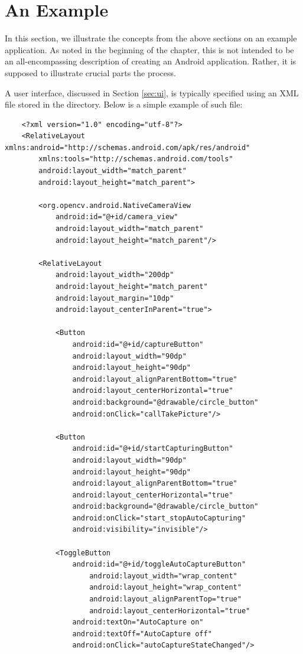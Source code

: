 \section{An Example} 

In this section, we illustrate the concepts from the above sections on an example application. 
As noted in the beginning of the chapter, this is not intended to be an all-encompassing description of creating an Android application. 
Rather, it is supposed to illustrate crucial parts the process. 

A user interface, discussed in Section \ref{sec:ui}, is typically specified using an XML file stored in the  directory.
Below is a simple example of such file: 

\begin{lstlisting}
    <?xml version="1.0" encoding="utf-8"?>
    <RelativeLayout xmlns:android="http://schemas.android.com/apk/res/android"
        xmlns:tools="http://schemas.android.com/tools"
        android:layout_width="match_parent"
        android:layout_height="match_parent">
    
        <org.opencv.android.NativeCameraView
            android:id="@+id/camera_view"
            android:layout_width="match_parent"
            android:layout_height="match_parent"/>
        
        <RelativeLayout
    	    android:layout_width="200dp"
    	    android:layout_height="match_parent"
    	    android:layout_margin="10dp"
    	    android:layout_centerInParent="true">
    	    
            <Button
    	        android:id="@+id/captureButton"
    	        android:layout_width="90dp"
    	        android:layout_height="90dp"
    	        android:layout_alignParentBottom="true"
    	        android:layout_centerHorizontal="true"
    	        android:background="@drawable/circle_button"
    	        android:onClick="callTakePicture"/>
            
            <Button
    	        android:id="@+id/startCapturingButton"
    	        android:layout_width="90dp"
    	        android:layout_height="90dp"
    	        android:layout_alignParentBottom="true"
    	        android:layout_centerHorizontal="true"
    	        android:background="@drawable/circle_button"
    	        android:onClick="start_stopAutoCapturing"
    	        android:visibility="invisible"/>
    	          
    	    <ToggleButton
    	        android:id="@+id/toggleAutoCaptureButton"
                    android:layout_width="wrap_content" 
                    android:layout_height="wrap_content" 
                    android:layout_alignParentTop="true"
                    android:layout_centerHorizontal="true"
    	        android:textOn="AutoCapture on"
    	        android:textOff="AutoCapture off"	    
    	        android:onClick="autoCaptureStateChanged"/>
    

\end{lstlisting}
